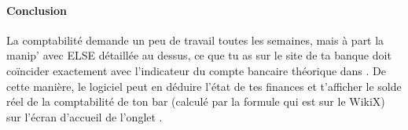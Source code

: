 \documentclass[12pt,french]{article}
\begin{document}
\paragraph{Conclusion} La comptabilité demande un peu de travail toutes les semaines, mais à part la manip' avec ELSE détaillée au dessus, ce que tu as sur le site de ta banque doit coïncider exactement avec l'indicateur du compte bancaire théorique dans . De cette manière, le logiciel peut en déduire l'état de tes finances et t'afficher le solde réel de la comptabilité de ton bar (calculé par la formule qui est sur le WikiX) sur l'écran d'accueil de l'onglet .
\end{document}
